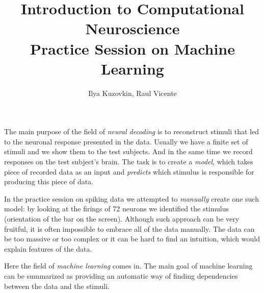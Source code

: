 \documentclass[a4paper,11pt]{article}
\author{\large{Ilya Kuzovkin, Raul Vicente}}
\title{\huge{Introduction to Computational Neuroscience}\\\LARGE{Practice Session on Machine Learning}}
\begin{document}
\maketitle


%
%
The main purpose of the field of \emph{neural decoding} is to reconstruct stimuli that led to the neuronal response presented in the data. Usually we have a finite set of stimuli and we show them to the test subjects. And in the same time we record responses on the test subject's brain. The task is to create a \emph{model}, which takes piece of recorded data as an input and \emph{predicts} which stimulus is responsible for producing this piece of data.

In the practice session on spiking data we attempted to \emph{manually} create one such model: by looking at the firings of 72 neurons we identified the stimulus (orientation of the bar on the screen). Although such approach can be very fruitful, it is often impossible to embrace all of the data manually. The data can be too massive or too complex or it can be hard to find an intuition, which would explain features of the data.

Here the field of \emph{machine learning} comes in. The main goal of machine learning can be summarized as providing an automatic way of finding dependencies between the data and the stimuli.\\
\end{document}
